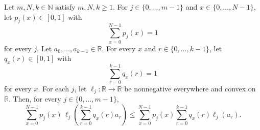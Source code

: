 \begin{theorem}
Let $m,N,k\in\mathbb N$ satisfy $m,N,k\ge1$.  For
$j\in\{0,\ldots,m-1\}$ and $x\in\{0,\ldots,N-1\}$, let
$p_j(x)\in[0,1]$ with
\[
  \sum_{x=0}^{N-1}p_j(x)=1
\]
for every $j$.  Let $a_0,\ldots,a_{k-1}\in\mathbb R$.  For every $x$ and
$r\in\{0,\ldots,k-1\}$, let $q_x(r)\in[0,1]$ with
\[
  \sum_{r=0}^{k-1}q_x(r)=1
\]
for every $x$.  For each $j$, let
$\ell_j:\mathbb R\to\mathbb R$ be nonnegative everywhere and convex on
$\mathbb R$.  Then, for every $j\in\{0,\ldots,m-1\}$,
\[
 \sum_{x=0}^{N-1}p_j(x)\,
 \ell_j\!\left(\sum_{r=0}^{k-1}q_x(r)a_r\right)
 \le
 \sum_{x=0}^{N-1}p_j(x)
 \sum_{r=0}^{k-1}q_x(r)\ell_j(a_r).
\]
\end{theorem}
